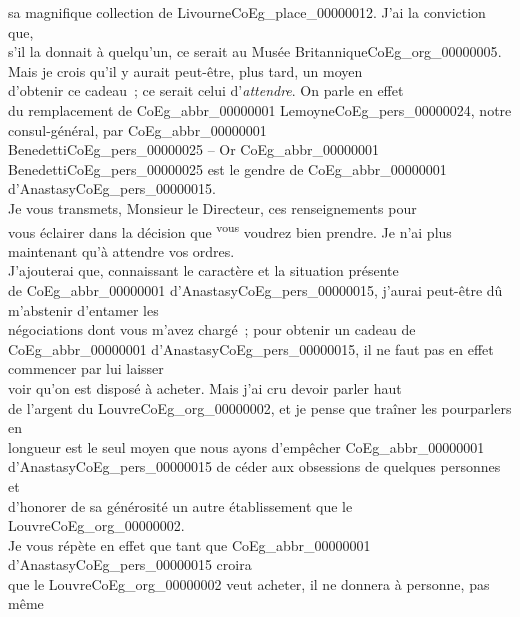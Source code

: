 \documentclass{book}
\begin{document}
sa magnifique collection de Livourne\gls{CoEg_place_00000012}. J’ai la conviction que,\\
s’il la donnait à quelqu’un, ce serait au Musée Britannique\gls{CoEg_org_00000005}.\\
\indent Mais je crois qu’il y aurait peut-être, plus tard, un moyen\\
d’obtenir ce cadeau~; ce serait celui d’\textit{attendre}. On parle en effet\\
du remplacement de \gls{CoEg_abbr_00000001} Lemoyne\gls{CoEg_pers_00000024}, notre consul-général, par \gls{CoEg_abbr_00000001}\\
Benedetti\gls{CoEg_pers_00000025} – Or \gls{CoEg_abbr_00000001} Benedetti\gls{CoEg_pers_00000025} est le gendre de \gls{CoEg_abbr_00000001} d’Anastasy\gls{CoEg_pers_00000015}.\\
\indent Je vous transmets, Monsieur le Directeur, ces renseignements pour\\
vous éclairer dans la décision que \textsuperscript{vous} voudrez bien prendre. Je n’ai plus\\
maintenant qu’à attendre vos ordres.\\
\indent J’ajouterai que, connaissant le caractère et la situation présente\\
de \gls{CoEg_abbr_00000001} d’Anastasy\gls{CoEg_pers_00000015}, j’aurai peut-être dû m’abstenir d’entamer les\\
négociations dont vous m’avez chargé~; pour obtenir un cadeau de\\
\gls{CoEg_abbr_00000001} d’Anastasy\gls{CoEg_pers_00000015}, il ne faut pas en effet commencer par lui laisser\\
voir qu’on est disposé à acheter. Mais j’ai cru devoir parler haut\\
de l’argent du Louvre\gls{CoEg_org_00000002}, et je pense que traîner les pourparlers en\\
longueur est le seul moyen que nous ayons d’empêcher \gls{CoEg_abbr_00000001}\\
d’Anastasy\gls{CoEg_pers_00000015} de céder aux obsessions de quelques personnes et\\
d’honorer de sa générosité un autre établissement que le Louvre\gls{CoEg_org_00000002}.\\
Je vous répète en effet que tant que \gls{CoEg_abbr_00000001} d’Anastasy\gls{CoEg_pers_00000015} croira\\
que le Louvre\gls{CoEg_org_00000002} veut acheter, il ne donnera à personne, pas même\\
\end{document}
